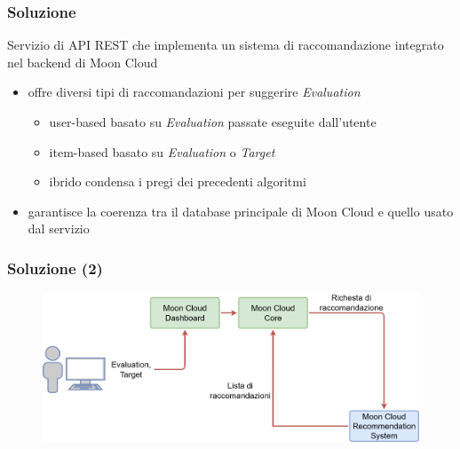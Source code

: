 \begin{frame}
    \frametitle{Soluzione}
    Servizio di \alert{API REST} che implementa un \alert{sistema di raccomandazione} \alert{integrato} nel \alert{backend} di Moon Cloud
    \begin{itemize}
        \item offre diversi tipi di raccomandazioni per \alert{suggerire \textit{Evaluation}}
        \begin{itemize}
            \item \alert{user-based} basato su \textit{Evaluation} passate eseguite dall'utente%
            \item \alert{item-based} basato su \textit{Evaluation} o \textit{Target}%
            \item \alert{ibrido} condensa i pregi dei precedenti algoritmi%
        \end{itemize}
        \item garantisce la \alert{coerenza} tra il database principale di Moon Cloud e quello usato dal servizio
    \end{itemize}
\end{frame}

\begin{frame}
    \frametitle{Soluzione (2)}
    \begin{figure}
        \centering
        \includegraphics[scale=0.34]{images/UML_MoonCloud_HowToDoPres}
    \end{figure}
\end{frame}

